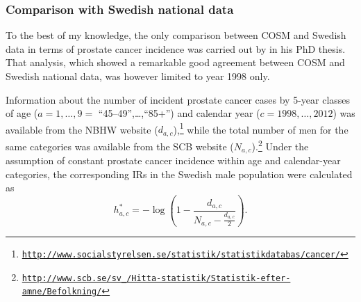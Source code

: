 \subsubsection{Comparison with Swedish national data}
To the best of my knowledge, the only comparison between COSM and Swedish data in terms of prostate cancer incidence was carried out by  \citet[section~5.4]{orsini_physical_2008} in his PhD thesis. That analysis, which showed a remarkable good agreement between COSM and Swedish national data, was however limited to year 1998 only.

Information about the number of incident prostate cancer cases  by 5-year classes of age ($a=1,\ldots,9=$ ``45--49'',\dots,``85+'') and calendar year ($c=1998,\ldots,2012$) was available from the NBHW website ($d_{a,c}$),\footnote{\href{http://www.socialstyrelsen.se/statistik/statistikdatabas/cancer/}{\texttt{http://www.socialstyrelsen.se/statistik/statistikdatabas/cancer/}}} while the total number of men for the same categories  was available from the SCB website ($N_{a,c}$).\footnote{\href{http://www.scb.se/sv\_/Hitta-statistik/Statistik-efter-amne/Befolkning/}{\texttt{http://www.scb.se/sv\_/Hitta-statistik/Statistik-efter-amne/Befolkning/}}}  Under the assumption of constant prostate cancer incidence within age and calendar-year categories, the corresponding IRs in the Swedish male population were calculated as
\begin{equation*}
h_{a,c}^* = -\log \left(1 - \frac{d_{a,c}}{N_{a,c}-\frac{d_{a,c}}{2}} \right).
\end{equation*}

